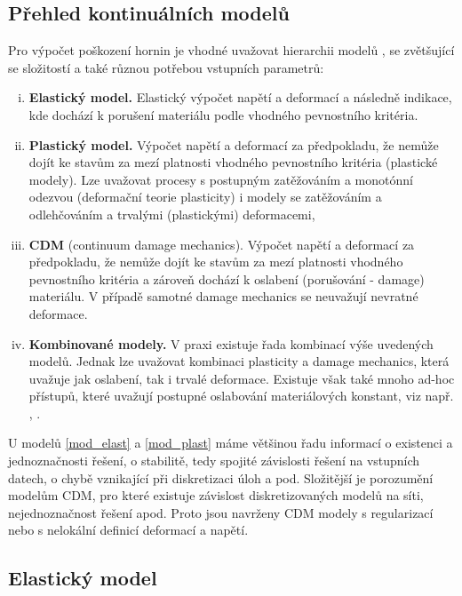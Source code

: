 \documentclass{article}
\begin{document}
\subsection{Přehled kontinuálních modelů} 

Pro výpočet poškození hornin je vhodné uvažovat hierarchii modelů \cite{Blaheta2013a}, se zvětšující se složitostí a také různou potřebou vstupních parametrů:
\begin{enumerate}[(i)]
	\item \label{mod_elast} {\bf Elastický model.} Elastický výpočet napětí a deformací a následně indikace, kde dochází k porušení materiálu podle vhodného pevnostního kritéria.
	\item \label{mod_plast} {\bf Plastický model.} Výpočet napětí a deformací za předpokladu, že nemůže dojít ke stavům za mezí platnosti vhodného pevnostního kritéria (plastické modely). Lze uvažovat procesy s postupným zatěžováním a monotónní odezvou (deformační teorie plasticity) i modely se zatěžováním a odlehčováním a trvalými (plastickými) deformacemi,
	\item \label{mod_damage} {\bf CDM} (continuum damage mechanics). Výpočet napětí a deformací za předpokladu, že nemůže dojít ke stavům za mezí platnosti vhodného pevnostního kritéria a zároveň dochází k oslabení (porušování -  damage) materiálu. V případě samotné damage mechanics se neuvažují nevratné deformace.
	\item \label{mod_irev_cdm} {\bf Kombinované modely.} V praxi existuje řada kombinací výše uvedených modelů. Jednak lze uvažovat kombinaci plasticity a damage mechanics, která uvažuje jak oslabení, tak i trvalé deformace. Existuje však také mnoho ad-hoc přístupů, které uvažují postupné oslabování materiálových konstant, viz např. \cite{Perras2016}, \cite{Carranza-Torres1999}.
\end{enumerate}
U modelů \eqref{mod_elast} a \eqref{mod_plast} máme většinou řadu informací o existenci a jednoznačnosti
řešení, o stabilitě, tedy spojité závislosti řešení na vstupních datech, o chybě vznikající  při  diskretizaci  úloh  a  pod.  Složitější je porozumění  modelům CDM, pro které existuje závislost diskretizovaných  modelů na  síti, nejednoznačnost řešení  apod. Proto jsou navrženy CDM modely s regularizací nebo s nelokální definicí deformací a napětí.



\subsection{Elastický model}
\end{document}
